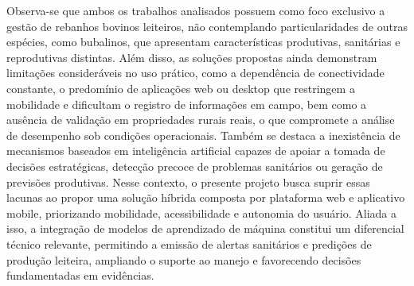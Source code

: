 Observa-se que ambos os trabalhos analisados possuem como foco exclusivo a gestão de rebanhos bovinos leiteiros, não contemplando particularidades de outras espécies, como bubalinos, que apresentam características produtivas, sanitárias e reprodutivas distintas. Além disso, as soluções propostas ainda demonstram limitações consideráveis no uso prático, como a dependência de conectividade constante, o predomínio de aplicações web ou desktop que restringem a mobilidade e dificultam o registro de informações em campo, bem como a ausência de validação em propriedades rurais reais, o que compromete a análise de desempenho sob condições operacionais. Também se destaca a inexistência de mecanismos baseados em inteligência artificial capazes de apoiar a tomada de decisões estratégicas, detecção precoce de problemas sanitários ou geração de previsões produtivas. Nesse contexto, o presente projeto busca suprir essas lacunas ao propor uma solução híbrida composta por plataforma web e aplicativo mobile, priorizando mobilidade, acessibilidade e autonomia do usuário. Aliada a isso, a integração de modelos de aprendizado de máquina constitui um diferencial técnico relevante, permitindo a emissão de alertas sanitários e predições de produção leiteira, ampliando o suporte ao manejo e favorecendo decisões fundamentadas em evidências.